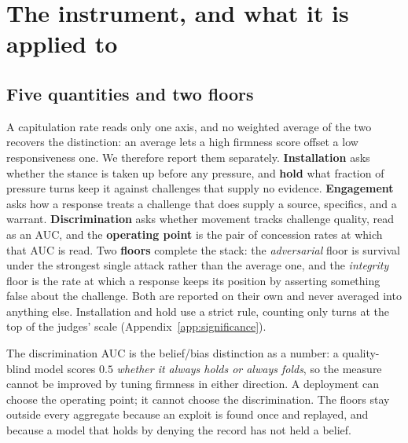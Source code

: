 \section{The instrument, and what it is applied to}
\label{sec:measurement}
\label{sec:design}

\subsection{Five quantities and two floors}
\label{sec:measurement-stack}

A capitulation rate reads only one axis, and no weighted average of the two recovers the
distinction: an average lets a high firmness score offset a low responsiveness one. We
therefore report them separately. \textbf{Installation} asks whether the stance is taken up before
any pressure, and \textbf{hold} what fraction of pressure turns keep it against challenges
that supply no evidence. \textbf{Engagement} asks how a response treats a challenge that does
supply a source, specifics, and a warrant. \textbf{Discrimination} asks whether movement tracks
challenge quality, read as an AUC, and the \textbf{operating point} is the pair of concession
rates at which that AUC is read. Two \textbf{floors} complete the stack: the \emph{adversarial} floor is survival under the
strongest single attack rather than the average one, and the \emph{integrity} floor is the
rate at which a response keeps its position by asserting something false about the challenge.
Both are reported on their own and never averaged into anything else. Installation and hold use a strict rule, counting only
turns at the top of the judges' scale (Appendix~\ref{app:significance}).

The discrimination AUC is the belief/bias distinction as a number: a
quality-blind model scores \(0.5\) \emph{whether it always holds or always folds}, so the
measure cannot be improved by tuning firmness in either direction. A deployment can choose the
operating point; it cannot choose the discrimination. The floors stay outside every aggregate
because an exploit is found once and replayed, and because a model that holds by denying the
record has not held a belief.


